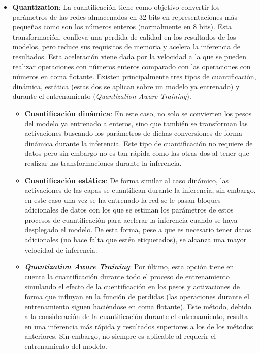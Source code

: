\documentclass[a4paper]{article}
\newcommand{\textbfit}[1]{\textbf{\textit{#1}}}
\begin{document}
\begin{itemize}
\begin{itemize}
    \end{itemize}
    \item \textbf{Quantization}: La cuantificación tiene como objetivo convertir los parámetros de las redes almacenados en 32 bits en representaciones más pequeñas como son los números enteros (normalmente en 8 bits). Esta transformación, conlleva una perdida de calidad en los resultados de los modelos, pero reduce sus requisitos de memoria y acelera la inferencia de resultados. Esta aceleración viene dada por la velocidad a la que se pueden realizar operaciones con números enteros comparado con las operaciones con números en coma flotante. Existen principalmente tres tipos de cuantificación, dinámica, estática (estas dos se aplican sobre un modelo ya entrenado) y durante el entrenamiento (\textit{Quantization Aware Training}).
    \begin{itemize}
        \item \textbf{Cuantificación dinámica}: En este caso, no solo se convierten los pesos del modelo ya entrenado a enteros, sino que también se transforman las activaciones buscando los parámetros de dichas conversiones de forma dinámica durante la inferencia. Este tipo de cuantificación no requiere de datos pero sin embargo no es tan rápida como las otras dos al tener que realizar las transformaciones durante la inferencia.
        \item \textbf{Cuantificación estática}: De forma similar al caso dinámico, las activaciones de las capas se cuantifican durante la inferencia, sin embargo, en este caso una vez se ha entrenado la red se le pasan bloques adicionales de datos con los que se estiman los parámetros de estos procesos de cuantificación para acelerar la inferencia cuando se haya desplegado el modelo. De esta forma, pese a que es necesario tener datos adicionales (no hace falta que estén etiquetados), se alcanza una mayor velocidad de inferencia.
        \item \textbfit{Quantization Aware Training}: Por último, esta opción tiene en cuenta la cuantificación durante todo el proceso de entrenamiento simulando el efecto de la cuentificación en los pesos y activaciones de forma que influyan en la función de perdidas (las operaciones durante el entrenamiento siguen haciéndose en coma flotante). Este método, debido a la consideración de la cuantificación durante el entrenamiento, resulta en una inferencia más rápida y resultados superiores a los de los métodos anteriores. Sin embargo, no siempre es aplicable al requerir el entrenamiento del modelo.

\end{itemize}
\end{itemize}
\end{document}
